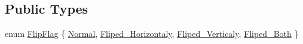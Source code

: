 \subsection*{Public Types}
\begin{DoxyCompactItemize}
\item 
enum \hyperlink{classZeta_1_1Bitmap_a8cb28cf4226b7d6bedf6c9bb2413b3fa}{Flip\+Flag} \{ \hyperlink{classZeta_1_1Bitmap_a8cb28cf4226b7d6bedf6c9bb2413b3faad95504740b4fa9384ac72564cd282755}{Normal}, 
\hyperlink{classZeta_1_1Bitmap_a8cb28cf4226b7d6bedf6c9bb2413b3faaf348b571904c666b29639666ab027697}{Fliped\+\_\+\+Horizontaly}, 
\hyperlink{classZeta_1_1Bitmap_a8cb28cf4226b7d6bedf6c9bb2413b3faaac56c661dd220f5f9dd9b79fc5cf53de}{Fliped\+\_\+\+Verticaly}, 
\hyperlink{classZeta_1_1Bitmap_a8cb28cf4226b7d6bedf6c9bb2413b3faa8593d3469b4055679283171c09dba43d}{Fliped\+\_\+\+Both}
 \}
\end{DoxyCompactItemize}
